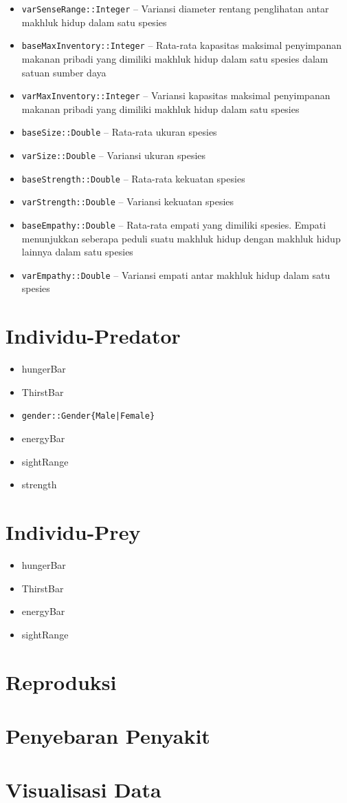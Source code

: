 \documentclass[12pt]{article}
\begin{document}
\begin{itemize}
    \item \texttt{varSenseRange::Integer} -- Variansi diameter rentang penglihatan antar makhluk hidup dalam satu spesies
    \item \texttt{baseMaxInventory::Integer} -- Rata-rata kapasitas maksimal penyimpanan makanan pribadi yang dimiliki makhluk hidup dalam satu spesies dalam satuan sumber daya
    \item \texttt{varMaxInventory::Integer} -- Variansi kapasitas maksimal penyimpanan makanan pribadi yang dimiliki makhluk hidup dalam satu spesies
    \item \texttt{baseSize::Double} -- Rata-rata ukuran spesies
    \item \texttt{varSize::Double} -- Variansi ukuran spesies
    \item \texttt{baseStrength::Double} -- Rata-rata kekuatan spesies
    \item \texttt{varStrength::Double} -- Variansi kekuatan spesies
    \item \texttt{baseEmpathy::Double} -- Rata-rata empati yang dimiliki spesies. Empati menunjukkan seberapa peduli suatu makhluk hidup dengan makhluk hidup lainnya dalam satu spesies
    \item \texttt{varEmpathy::Double} -- Variansi empati antar makhluk hidup dalam satu spesies

\end{itemize}
\section{Individu-Predator}
\begin{itemize}
    \item hungerBar
    \item ThirstBar
    \item \texttt{gender::Gender\{Male|Female\}}
    \item energyBar
    \item sightRange
    \item strength
\end{itemize}
\section{Individu-Prey}
\begin{itemize}
    \item hungerBar
    \item ThirstBar
    \item energyBar
    \item sightRange
\end{itemize}
\section{Reproduksi}
\section{Penyebaran Penyakit}
\section{Visualisasi Data}


 
\end{document}
